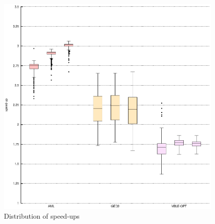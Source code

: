 \begin{figure}
\begin{center}
\includegraphics{img/boxplot}
\end{center}
\caption{Distribution of speed-ups}
\label{fig:boxplot}
\end{figure}

